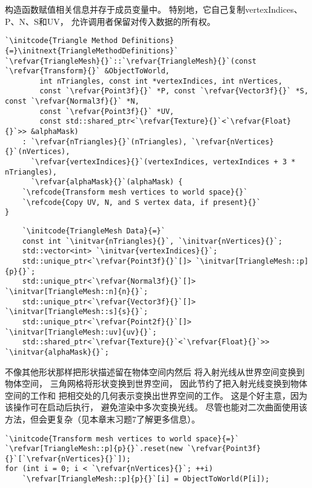构造函数赋值相关信息并存于成员变量中。
特别地，它自己复制{\ttfamily vertexIndices、P、N、S}和{\ttfamily UV}，
允许调用者保留对传入数据的所有权。
\begin{lstlisting}
`\initcode{Triangle Method Definitions}{=}\initnext{TriangleMethodDefinitions}`
`\refvar{TriangleMesh}{}`::`\refvar{TriangleMesh}{}`(const `\refvar{Transform}{}` &ObjectToWorld,
        int nTriangles, const int *vertexIndices, int nVertices,
        const `\refvar{Point3f}{}` *P, const `\refvar{Vector3f}{}` *S, const `\refvar{Normal3f}{}` *N,
        const `\refvar{Point3f}{}` *UV,
        const std::shared_ptr<`\refvar{Texture}{}`<`\refvar{Float}{}`>> &alphaMask)
    : `\refvar{nTriangles}{}`(nTriangles), `\refvar{nVertices}{}`(nVertices), 
      `\refvar{vertexIndices}{}`(vertexIndices, vertexIndices + 3 * nTriangles),
      `\refvar{alphaMask}{}`(alphaMask) {
    `\refcode{Transform mesh vertices to world space}{}`
    `\refcode{Copy UV, N, and S vertex data, if present}{}`
}
\end{lstlisting}
\begin{lstlisting}
    `\initcode{TriangleMesh Data}{=}`
    const int `\initvar{nTriangles}{}`, `\initvar{nVertices}{}`;
    std::vector<int> `\initvar{vertexIndices}{}`;
    std::unique_ptr<`\refvar{Point3f}{}`[]> `\initvar[TriangleMesh::p]{p}{}`;
    std::unique_ptr<`\refvar{Normal3f}{}`[]> `\initvar[TriangleMesh::n]{n}{}`;
    std::unique_ptr<`\refvar{Vector3f}{}`[]> `\initvar[TriangleMesh::s]{s}{}`;
    std::unique_ptr<`\refvar{Point2f}{}`[]> `\initvar[TriangleMesh::uv]{uv}{}`;
    std::shared_ptr<`\refvar{Texture}{}`<`\refvar{Float}{}`>> `\initvar{alphaMask}{}`;
\end{lstlisting}

不像其他形状那样把形状描述留在物体空间内然后
将入射光线从世界空间变换到物体空间，
三角网格将形状变换到世界空间，
因此节约了把入射光线变换到物体空间的工作和
把相交处的几何表示变换出世界空间的工作。
这是个好主意，因为该操作可在启动后执行，
避免渲染中多次变换光线。
尽管也能对二次曲面使用该方法，但会更复杂（见本章末习题7了解更多信息）。
\begin{lstlisting}
`\initcode{Transform mesh vertices to world space}{=}`
`\refvar[TriangleMesh::p]{p}{}`.reset(new `\refvar{Point3f}{}`[`\refvar{nVertices}{}`]);
for (int i = 0; i < `\refvar{nVertices}{}`; ++i)
    `\refvar[TriangleMesh::p]{p}{}`[i] = ObjectToWorld(P[i]);
\end{lstlisting}

